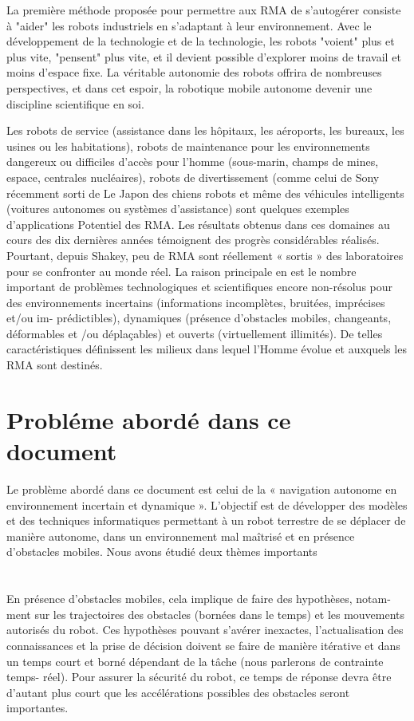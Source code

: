 La première méthode proposée pour permettre aux RMA de s'autogérer consiste à "aider" les robots industriels en s'adaptant à leur environnement. Avec le développement de la technologie et de la technologie, les robots "voient" plus et plus vite, "pensent" plus vite, et il devient possible d'explorer moins de travail et moins d'espace fixe. La véritable autonomie des robots offrira de nombreuses perspectives, et dans cet espoir, la robotique mobile autonome devenir une discipline scientifique en soi.

Les robots de service (assistance dans les hôpitaux, les aéroports, les bureaux, les usines ou les habitations), robots de maintenance pour les environnements dangereux ou difficiles d'accès pour l'homme (sous-marin, champs de mines, espace, centrales nucléaires), robots de divertissement (comme celui de Sony récemment sorti de Le Japon des chiens robots et même des véhicules intelligents (voitures autonomes ou systèmes d'assistance) sont quelques exemples d'applications Potentiel des RMA.
Les résultats obtenus dans ces domaines au cours des dix dernières années témoignent
des progrès considérables réalisés. Pourtant, depuis Shakey, peu de RMA sont réellement
« sortis » des laboratoires pour se confronter au monde réel. La raison principale en est le
nombre important de problèmes technologiques et scientifiques encore non-résolus pour
des environnements incertains (informations incomplètes, bruitées, imprécises et/ou im-
prédictibles), dynamiques (présence d'obstacles mobiles, changeants, déformables et /ou
déplaçables) et ouverts (virtuellement illimités). De telles caractéristiques définissent
les milieux dans lequel l'Homme évolue et auxquels les RMA sont destinés.
\section*{Probléme abordé dans ce document}

Le problème abordé dans ce document est celui de la « navigation autonome en
environnement incertain et dynamique ». L'objectif est de développer des modèles et
des techniques informatiques permettant à un robot terrestre de se déplacer de manière
autonome, dans un environnement mal maîtrisé
et en présence d'obstacles mobiles. Nous avons étudié deux thèmes importants
\section{}
En présence d'obstacles mobiles, cela implique de faire des hypothèses, notam-
ment sur les trajectoires des obstacles (bornées dans le temps) et les mouvements
autorisés du robot. Ces hypothèses pouvant s'avérer inexactes, l'actualisation des
connaissances et la prise de décision doivent se faire de manière itérative et dans un
temps court et borné dépendant de la tâche (nous parlerons de contrainte temps-
réel). Pour assurer la sécurité du robot, ce temps de réponse devra être d'autant plus court que les accélérations possibles des obstacles seront importantes.